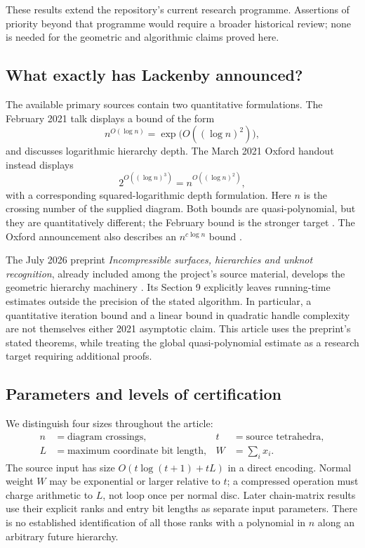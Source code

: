 These results extend the repository's current research programme. Assertions
of priority beyond that programme would require a broader historical review;
none is needed for the geometric and algorithmic claims proved here.

\subsection{What exactly has Lackenby announced?}
\label{subsec:announcements}

The available primary sources contain two quantitative formulations. The
February 2021 talk displays a bound of the form
\[
 n^{O(\log n)}=\exp\bigl(O((\log n)^2)\bigr),
\]
and discusses logarithmic hierarchy depth. The March 2021 Oxford handout
instead displays
\[
 2^{O((\log n)^3)}=n^{O((\log n)^2)},
\]
with a corresponding squared-logarithmic depth formulation. Here $n$ is the
crossing number of the supplied diagram. Both bounds are quasi-polynomial,
but they are quantitatively different; the February bound is the stronger
target \cite{lackenby2021feb,lackenby2021mar}. The Oxford announcement also
describes an $n^{c\log n}$ bound \cite{oxford2021}.

The July 2026 preprint \emph{Incompressible surfaces, hierarchies and unknot
recognition}, already included among the project's source material, develops
the geometric hierarchy machinery \cite{lackenby2026}. Its Section 9
explicitly leaves running-time estimates outside the precision of the stated
algorithm. In particular, a quantitative iteration bound and a linear bound
in quadratic handle complexity are not themselves either 2021 asymptotic
claim. This article uses the preprint's stated theorems, while treating the
global quasi-polynomial estimate as a research target requiring additional
proofs.

\subsection{Parameters and levels of certification}

We distinguish four sizes throughout the article:
\[
\begin{aligned}
 n&=\text{diagram crossings},&
 t&=\text{source tetrahedra},\\
 L&=\text{maximum coordinate bit length},&
 W&=\sum_i x_i.
\end{aligned}
\]
The source input has size $O(t\log(t+1)+tL)$ in a direct encoding. Normal
weight $W$ may be exponential or larger relative to $t$; a compressed
operation must charge arithmetic to $L$, not loop once per normal disc.
Later chain-matrix results use their explicit ranks and entry bit lengths
as separate input parameters. There is no established identification of all
those ranks with a polynomial in $n$ along an arbitrary future hierarchy.

